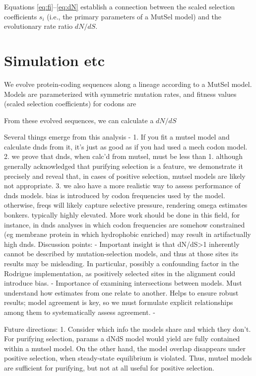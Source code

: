 \documentclass[11pt]{article}
\begin{document}
Equations \eqref{eq:fi}--\eqref{eq:dN} establish a connection between the scaled selection coefficients $s_i$ (i.e., the primary parameters of a MutSel model) and the evolutionary rate ratio $dN/dS$.

\section*{Simulation etc}
We evolve protein-coding sequences along a lineage according to a MutSel model. Models are parameterized with symmetric mutation rates, and fitness values (scaled selection coefficients) for codons are 


 From these evolved sequences, we can calculate a $dN/dS$
	
	
	
	
 Several things emerge from this analysis - 
1. If you fit a mutsel model and calculate dnds from it, it's just as good as if you had used a mech codon model. 
2. we prove that dnds, when calc'd from mutsel, must be less than 1. although generally acknowledged that purifying selection is a feature, we demonstrate it precisely and reveal that, in cases of positive selection, mutsel models are likely not appropriate.
3. we also have a more realistic way to assess performance of dnds models. bias is introduced by codon frequencies used by the model. otherwise, freqs will likely capture selective pressure, rendering omega estimates bonkers. typically highly elevated. More work should be done in this field, for instance, in dnds analyses in which codon frequencies are somehow constrained (eg membrane protein in which hydrophobic enriched) may result in artifactually high dnds.
Discussion points:
- Important insight is that dN/dS>1 inherently cannot be described by mutation-selection models, and thus at those sites its results may be misleading. In particular, possibly a confounding factor in the Rodrigue implementation, as positively selected sites in the alignment could introduce bias.
- Importance of examining intersections between models. Must understand how estimates from one relate to another. Helps to ensure robust results; model agreement is key, so we must formulate explicit relationships among them to systematically assess agreement.
- 

	
	

Future directions:
1. Consider which info the models share and which they don't. For purifying selection, params a dNdS model would yield are fully contained within a mutsel model. On the other hand, the model overlap disappears under positive selection, when steady-state equilibrium is violated. Thus, mutsel models are sufficient for purifying, but not at all useful for positive selection.
\end{document}
